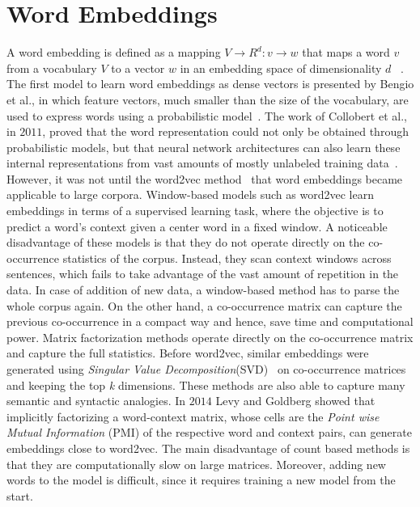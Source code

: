 \section{Word Embeddings}
\label{sec:wordembeddig}
A word embedding is defined as a mapping $ V\rightarrow { R }^{ d }:v \rightarrow w $ that maps a word $v$ from a vocabulary $V$ to a vector  $w$  in an embedding space of dimensionality $d$ ~. The first model to learn word embeddings as dense vectors is presented by Bengio et al., in which feature vectors, much smaller than the size of the vocabulary, are used to express words using a probabilistic model~. The work of Collobert et al., in $2011$, proved that the word representation could not only be obtained through probabilistic models, but that neural network architectures can also learn these internal representations from vast amounts of mostly unlabeled training data~. However, it was not until the word2vec method~ that word embeddings became applicable to large corpora. 
Window-based models such as word2vec learn embeddings in terms of a supervised learning task, where the objective is to predict a word's context given a center word in a fixed window. A noticeable disadvantage of these models is that they do not operate directly on the co-occurrence statistics of the corpus. Instead, they scan context windows across sentences, which fails to take advantage of the vast amount of repetition in the data. In case of addition of new data, a window-based method has to parse the whole corpus again. On the other hand, a co-occurrence matrix can capture the previous co-occurrence in a compact way and hence, save time and computational power. Matrix factorization methods operate directly on the co-occurrence matrix and capture the full statistics. Before word2vec, similar embeddings were generated using \emph{Singular Value Decomposition}(SVD)~ on co-occurrence matrices and keeping the top \emph{k} dimensions. These methods are also able to capture many semantic and syntactic analogies. In $2014$ Levy and Goldberg showed that implicitly factorizing a word-context matrix, whose cells are the \emph{Point wise Mutual Information} (PMI) of the respective word and context pairs, can generate embeddings close to word2vec.
The main disadvantage of count based methods is that they are computationally slow on large matrices. Moreover, adding new words to the model is difficult, since it requires training a new model from the start.\\
